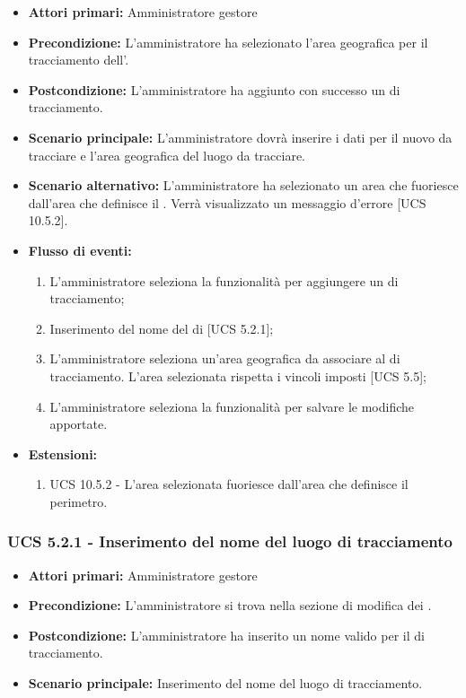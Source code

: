 \begin{itemize}
    \item \textbf{Attori primari:} Amministratore gestore
    \item \textbf{Precondizione:} L'amministratore ha selezionato l’area geografica per il tracciamento dell'.
    \item \textbf{Postcondizione:} L'amministratore ha aggiunto con successo un  di tracciamento.
    \item \textbf{Scenario principale:} L'amministratore dovrà inserire i dati per il nuovo  da tracciare e l'area geografica del luogo da tracciare.
    \item \textbf{Scenario alternativo:} L'amministratore ha selezionato un area che fuoriesce dall'area che definisce il . Verrà visualizzato un messaggio d'errore [UCS 10.5.2].
    \item \textbf{Flusso di eventi:}
    \begin{enumerate}     
        \item L'amministratore seleziona la funzionalità per aggiungere un  di tracciamento;
        \item Inserimento del nome del  di  [UCS 5.2.1];
        \item L'amministratore seleziona un'area geografica da associare al  di tracciamento. L'area selezionata rispetta i vincoli imposti [UCS 5.5]; 
        \item L'amministratore seleziona la funzionalità per salvare le modifiche apportate.
    \end{enumerate}   
    \item \textbf{Estensioni:}
    \begin{enumerate}
        \item UCS 10.5.2 - L'area selezionata fuoriesce dall'area che definisce il perimetro.
    \end{enumerate}
\end{itemize}

\subsubsection{UCS 5.2.1 - Inserimento del nome del luogo di tracciamento}%
\begin{itemize}
    \item \textbf{Attori primari:} Amministratore gestore
    \item \textbf{Precondizione:} L'amministratore si trova nella sezione di modifica dei .
    \item \textbf{Postcondizione:} L'amministratore ha inserito un nome valido per il  di tracciamento.
    \item \textbf{Scenario principale:} Inserimento del nome del luogo di tracciamento.
\end{itemize}

